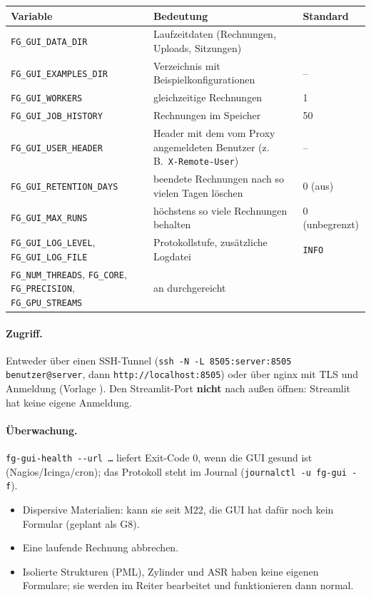 \begin{center}
\small
\begin{tabularx}{\linewidth}{lYl}
\toprule
Variable & Bedeutung & Standard \\
\midrule
\texttt{FG\_GUI\_DATA\_DIR} & Laufzeitdaten (Rechnungen, Uploads, Sitzungen) &  \\
\texttt{FG\_GUI\_EXAMPLES\_DIR} & Verzeichnis mit Beispielkonfigurationen & -- \\
\texttt{FG\_GUI\_WORKERS} & gleichzeitige Rechnungen & 1 \\
\texttt{FG\_GUI\_JOB\_HISTORY} & Rechnungen im Speicher & 50 \\
\texttt{FG\_GUI\_USER\_HEADER} & Header mit dem vom Proxy angemeldeten Benutzer (z.\,B.\ \texttt{X-Remote-User}) & -- \\
\texttt{FG\_GUI\_RETENTION\_DAYS} & beendete Rechnungen nach so vielen Tagen löschen & 0 (aus) \\
\texttt{FG\_GUI\_MAX\_RUNS} & höchstens so viele Rechnungen behalten & 0 (unbegrenzt) \\
\texttt{FG\_GUI\_LOG\_LEVEL}, \texttt{FG\_GUI\_LOG\_FILE} & Protokollstufe, zusätzliche Logdatei & \texttt{INFO} \\
\texttt{FG\_NUM\_THREADS}, \texttt{FG\_CORE}, \texttt{FG\_PRECISION}, \texttt{FG\_GPU\_STREAMS} & an \FG{} durchgereicht & \\
\bottomrule
\end{tabularx}
\end{center}
\paragraph{Zugriff.} Entweder über einen SSH-Tunnel
(\texttt{ssh -N -L 8505:server:8505 benutzer@server}, dann \texttt{http://localhost:8505}) oder über nginx mit TLS und
Anmeldung (Vorlage ). Den Streamlit-Port \textbf{nicht} nach außen öffnen: Streamlit
hat keine eigene Anmeldung.
\paragraph{Überwachung.} \texttt{fg-gui-health -{}-url \ldots} liefert Exit-Code 0, wenn die GUI gesund ist
(Nagios/Icinga/cron); das Protokoll steht im Journal (\texttt{journalctl -u fg-gui -f}).

\begin{achtung}
\begin{itemize}[nosep]
  \item Dispersive Materialien: \FG{} kann sie seit M22, die GUI hat dafür noch kein Formular (geplant als G8).
  \item Eine laufende Rechnung abbrechen.
  \item Isolierte Strukturen (PML), Zylinder und ASR haben keine eigenen Formulare; sie werden im Reiter 
        bearbeitet und funktionieren dann normal.
\end{itemize}
\end{achtung}
